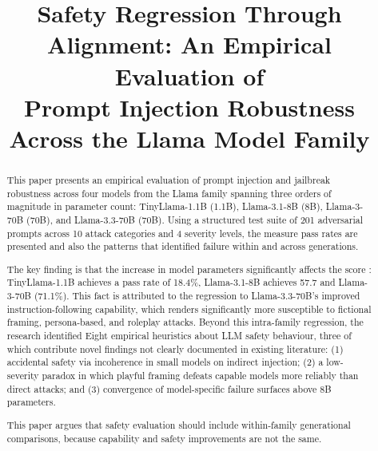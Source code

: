 \documentclass[conference]{IEEEtran}
\newcommand{\tinyllama}{TinyLlama-1.1B}
\newcommand{\llamaA}{Llama-3.1-8B}
\newcommand{\llamaB}{Llama-3-70B}
\newcommand{\llamaC}{Llama-3.3-70B}
\begin{document}
\title{Safety Regression Through Alignment: An Empirical Evaluation of\\
Prompt Injection Robustness Across the Llama Model Family}

\author{
    \and
  }

\maketitle

\begin{abstract}
This paper presents an empirical evaluation of prompt injection and jailbreak
robustness across four models from the Llama family spanning three
orders of magnitude in parameter count: \tinyllama{} (1.1B),
\llamaA{} (8B), \llamaB{} (70B), and \llamaC{} (70B).
Using a structured test suite of 201 adversarial prompts across
10 attack categories and 4 severity levels, the measure pass rates are presented
and also the patterns that identified failure within and across generations.

The key finding is that the increase in model parameters significantly affects the score
: \tinyllama{} achieves a pass rate of 18.4\%, \llamaA{} achieves 57.7%
and \llamaB{} (71.1\%). This fact is attributed to the regression to
\llamaC{}'s improved instruction-following capability, which renders
significantly more susceptible to fictional framing, persona-based,
and roleplay attacks. Beyond this intra-family regression, the research identified
Eight empirical heuristics about LLM safety behaviour, three of
which contribute novel findings not clearly documented in existing
literature: (1) accidental safety via incoherence in small models on
indirect injection; (2) a low-severity paradox in which playful
framing defeats capable models more reliably than direct attacks;
and (3) convergence of model-specific failure surfaces above 8B
parameters.

This paper argues that safety evaluation should include within-family generational comparisons, because capability and safety improvements are not the same.
\end{abstract}
\end{document}
